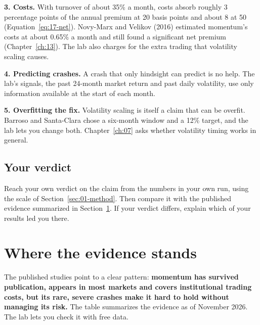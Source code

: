 \textbf{3. Costs.} With turnover of about 35\% a month, costs absorb roughly 3 percentage points of the annual premium at 20 basis points and about 8 at 50 (Equation~\eqref{eq:17-net}). Novy-Marx and Velikov (2016) estimated momentum's costs at about 0.65\% a month and still found a significant net premium (Chapter~\ref{ch:13}). The lab also charges for the extra trading that volatility scaling causes.

\textbf{4. Predicting crashes.} A crash that only hindsight can predict is no help. The lab's signals, the past 24-month market return and past daily volatility, use only information available at the start of each month.

\textbf{5. Overfitting the fix.} Volatility scaling is itself a claim that can be overfit. Barroso and Santa-Clara chose a six-month window and a 12\% target, and the lab lets you change both. Chapter~\ref{ch:07} asks whether volatility timing works in general.

\subsection*{Your verdict}

Reach your own verdict on the claim from the numbers in your own run, using the scale of Section~\ref{sec:01-method}. Then compare it with the published evidence summarized in Section~\ref{sec:05-verdict}. If your verdict differs, explain which of your results led you there.

\section{Where the evidence stands}
\label{sec:05-verdict}

The published studies point to a clear pattern: \textbf{momentum has survived publication, appears in most markets and covers institutional trading costs, but its rare, severe crashes make it hard to hold without managing its risk.} The table summarizes the evidence as of November 2026. The lab lets you check it with free data.

